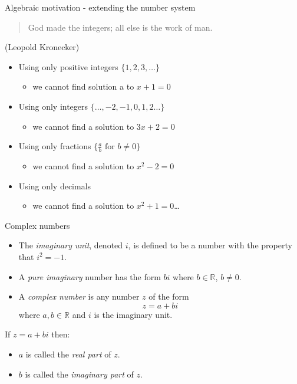 \documentclass{beamer}
\begin{document}

\begin{frame}{Algebraic motivation - extending the number system}
\begin{quote}
God made the integers; all else is the work of man.
\end{quote}
(Leopold Kronecker)\vfill
\begin{itemize}
	\item Using only positive integers $\{1, 2, 3, \dots\}$
	\begin{itemize}
		\item we cannot find solution a to $x+1 = 0$
	\end{itemize}\vfill
	\item Using only integers $\{\dots, -2, -1, 0, 1, 2 \dots\}$
	\begin{itemize}
		\item we cannot find a solution to $3x+2 = 0$
	\end{itemize}\vfill
	\item Using only fractions $\{\frac{a}{b} \text{ for } b\neq0 \}$
	\begin{itemize}
		\item we cannot find a solution to $x^2-2 =0$
	\end{itemize}\vfill
	\item Using only decimals
	\begin{itemize}
		\item we cannot find a solution to $x^2 + 1 = 0$\dots
	\end{itemize}
\end{itemize}
\end{frame}

\begin{frame}{Complex numbers}
\begin{definition}
\begin{itemize}
\item
The \emph{imaginary unit}, denoted $i$, is defined to be
a number with the property that $i^2=-1$.
\item
A \emph{pure imaginary} number has the form $bi$ where 
$b\in \mathbb{R}$, $b\neq 0$.
\item
A \emph{complex number} is any number $z$ of the form
\[ z = a + bi\]
where $a,b\in \mathbb{R}$ and $i$ is the imaginary unit.
\end{itemize}
\end{definition}
\begin{definition}
If $z = a + bi$ then:
\begin{itemize}
\item
$a$ is called the \emph{real part} of $z$.
\item
$b$ is called the \emph{imaginary part} of $z$.
\end{itemize}
\end{definition}
\end{frame}
\end{document}
